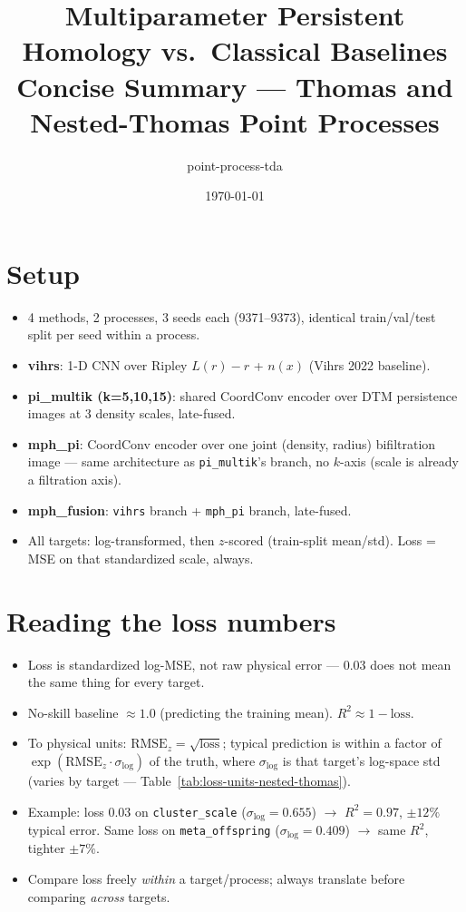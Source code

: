 \documentclass[11pt]{article}
\title{Multiparameter Persistent Homology vs.\ Classical Baselines\\
\large Concise Summary --- Thomas and Nested-Thomas Point Processes}
\author{point-process-tda}
\date{\today}
\begin{document}
\maketitle
\vspace{-2em}

\section{Setup}

\begin{itemize}
  \item 4 methods, 2 processes, 3 seeds each (9371--9373), identical train/val/test
    split per seed within a process.
  \item \textbf{vihrs}: 1-D CNN over Ripley $L(r)-r$ + $n(x)$ (Vihrs 2022 baseline).
  \item \textbf{pi\_multik (k=5,10,15)}: shared CoordConv encoder over DTM
    persistence images at 3 density scales, late-fused.
  \item \textbf{mph\_pi}: CoordConv encoder over one joint (density, radius)
    bifiltration image --- same architecture as \texttt{pi\_multik}'s branch, no
    $k$-axis (scale is already a filtration axis).
  \item \textbf{mph\_fusion}: \texttt{vihrs} branch + \texttt{mph\_pi} branch,
    late-fused.
  \item All targets: log-transformed, then $z$-scored (train-split mean/std).
    Loss = MSE on that standardized scale, always.
\end{itemize}

\section{Reading the loss numbers}
\label{sec:units}

\begin{itemize}
  \item Loss is standardized log-MSE, not raw physical error --- 0.03 does not mean
    the same thing for every target.
  \item No-skill baseline $\approx 1.0$ (predicting the training mean). $R^2 \approx
    1 - \mathrm{loss}$.
  \item To physical units: $\mathrm{RMSE}_z = \sqrt{\mathrm{loss}}$; typical
    prediction is within a factor of $\exp(\mathrm{RMSE}_z \cdot \sigma_{\log})$ of
    the truth, where $\sigma_{\log}$ is that target's log-space std (varies by
    target --- Table~\ref{tab:loss-units-nested-thomas}).
  \item Example: loss $0.03$ on \texttt{cluster\_scale} ($\sigma_{\log}=0.655$)
    $\to$ $R^2=0.97$, $\pm12\%$ typical error. Same loss on \texttt{meta\_offspring}
    ($\sigma_{\log}=0.409$) $\to$ same $R^2$, tighter $\pm7\%$.
  \item Compare loss freely \emph{within} a target/process; always translate before
    comparing \emph{across} targets.
\end{itemize}
\end{document}
